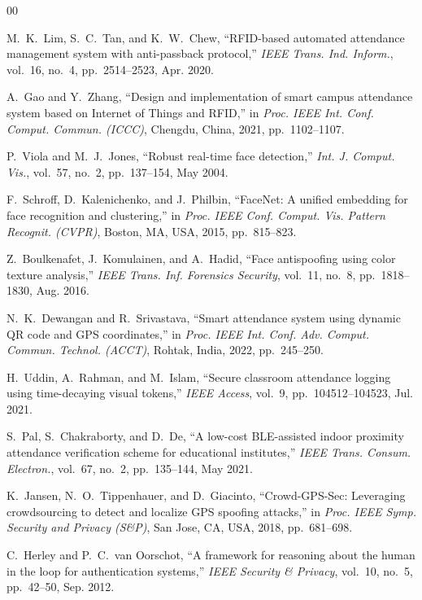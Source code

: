 \documentclass[conference]{IEEEtran}
\begin{document}
\begin{thebibliography}{00}

M.~K.~Lim, S.~C.~Tan, and K.~W.~Chew, ``RFID-based automated attendance management system with anti-passback protocol,'' \textit{IEEE Trans. Ind. Inform.}, vol.~16, no.~4, pp.~2514--2523, Apr. 2020.

A.~Gao and Y.~Zhang, ``Design and implementation of smart campus attendance system based on Internet of Things and RFID,'' in \textit{Proc. IEEE Int. Conf. Comput. Commun. (ICCC)}, Chengdu, China, 2021, pp.~1102--1107.

P.~Viola and M.~J.~Jones, ``Robust real-time face detection,'' \textit{Int. J. Comput. Vis.}, vol.~57, no.~2, pp.~137--154, May 2004.

F.~Schroff, D.~Kalenichenko, and J.~Philbin, ``FaceNet: A unified embedding for face recognition and clustering,'' in \textit{Proc. IEEE Conf. Comput. Vis. Pattern Recognit. (CVPR)}, Boston, MA, USA, 2015, pp.~815--823.

Z.~Boulkenafet, J.~Komulainen, and A.~Hadid, ``Face antispoofing using color texture analysis,'' \textit{IEEE Trans. Inf. Forensics Security}, vol.~11, no.~8, pp.~1818--1830, Aug. 2016.

N.~K.~Dewangan and R.~Srivastava, ``Smart attendance system using dynamic QR code and GPS coordinates,'' in \textit{Proc. IEEE Int. Conf. Adv. Comput. Commun. Technol. (ACCT)}, Rohtak, India, 2022, pp.~245--250.

H.~Uddin, A.~Rahman, and M.~Islam, ``Secure classroom attendance logging using time-decaying visual tokens,'' \textit{IEEE Access}, vol.~9, pp.~104512--104523, Jul. 2021.

S.~Pal, S.~Chakraborty, and D.~De, ``A low-cost BLE-assisted indoor proximity attendance verification scheme for educational institutes,'' \textit{IEEE Trans. Consum. Electron.}, vol.~67, no.~2, pp.~135--144, May 2021.

K.~Jansen, N.~O.~Tippenhauer, and D.~Giacinto, ``Crowd-GPS-Sec: Leveraging crowdsourcing to detect and localize GPS spoofing attacks,'' in \textit{Proc. IEEE Symp. Security and Privacy (S\&P)}, San Jose, CA, USA, 2018, pp.~681--698.

C.~Herley and P.~C.~van Oorschot, ``A framework for reasoning about the human in the loop for authentication systems,'' \textit{IEEE Security \& Privacy}, vol.~10, no.~5, pp.~42--50, Sep. 2012.


\end{thebibliography}
\end{document}
